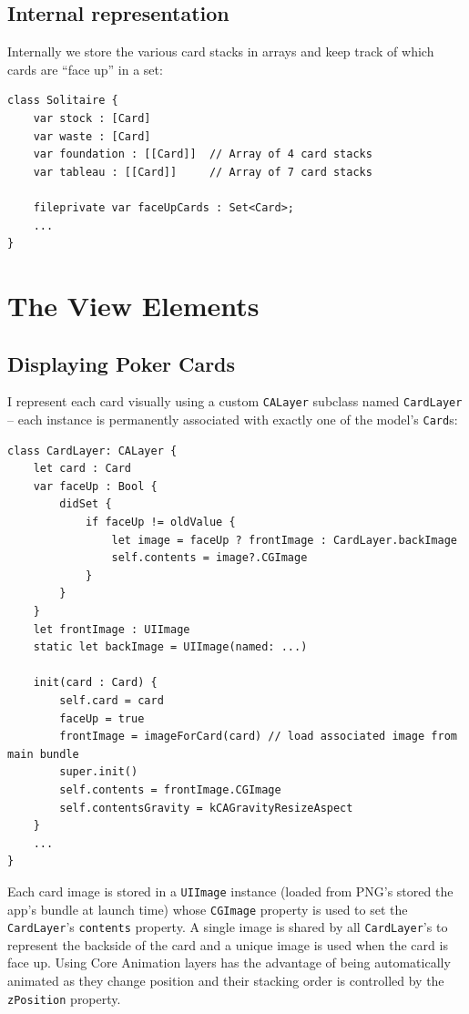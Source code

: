 \documentclass[11pt]{article}
\begin{document}

\subsection{Internal representation}

Internally we store the various card stacks in arrays and keep track
of which cards are ``face up'' in a set:
\begin{verbatim}
class Solitaire {
    var stock : [Card]
    var waste : [Card]
    var foundation : [[Card]]  // Array of 4 card stacks
    var tableau : [[Card]]     // Array of 7 card stacks
    
    fileprivate var faceUpCards : Set<Card>;
    ...
}
\end{verbatim}

\section{The View Elements} \label{sec:view}

\subsection{Displaying Poker Cards}

I represent each card visually using a custom
{\tt CALayer} subclass named {\tt CardLayer} -- each instance is permanently associated
with exactly one of the model's {\tt Card}s:
\begin{verbatim}
class CardLayer: CALayer {
    let card : Card
    var faceUp : Bool {
        didSet {
            if faceUp != oldValue {
                let image = faceUp ? frontImage : CardLayer.backImage
                self.contents = image?.CGImage
            }
        }
    }
    let frontImage : UIImage 
    static let backImage = UIImage(named: ...)
    
    init(card : Card) {
        self.card = card
        faceUp = true
        frontImage = imageForCard(card) // load associated image from main bundle
        super.init()
        self.contents = frontImage.CGImage
        self.contentsGravity = kCAGravityResizeAspect
    }
    ...
}
\end{verbatim}
Each card image is stored in a {\tt UIImage} instance 
(loaded from PNG's stored the app's bundle at launch time)
whose {\tt CGImage} property is used to set the {\tt CardLayer}'s 
{\tt contents} property.
A single image is shared
by all {\tt CardLayer}'s to represent the backside of the card
and a unique image is used when the card is face up.
Using Core Animation layers has the advantage of being automatically
animated as they change position and their stacking order is
controlled by the {\tt zPosition} property. 
\end{document}
